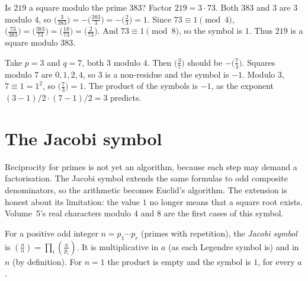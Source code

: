 \begin{examplex}
Is $219$ a square modulo the prime $383$? Factor $219=3\cdot 73$.
Both $383$ and $3$ are $3$ modulo $4$, so $\bigl(\frac{3}{383}\bigr)=-\bigl(\frac{383}{3}\bigr)=-\bigl(\frac{2}{3}\bigr)=1$.
Since $73\equiv 1\pmod 4$, $\bigl(\frac{73}{383}\bigr)=\bigl(\frac{383}{73}\bigr)=\bigl(\frac{18}{73}\bigr)=\bigl(\frac{2}{73}\bigr)$.
And $73\equiv 1\pmod 8$, so the symbol is $1$. Thus $219$ is a square modulo $383$.
\end{examplex}

\begin{examplex}
Take $p=3$ and $q=7$, both $3$ modulo $4$. Then $\bigl(\frac{3}{7}\bigr)$ should be $-\bigl(\frac{7}{3}\bigr)$.
Squares modulo $7$ are $0,1,2,4$, so $3$ is a non-residue and the symbol is $-1$.
Modulo $3$, $7\equiv 1=1^2$, so $\bigl(\frac{7}{3}\bigr)=1$. The product of the symbols is $-1$, as the exponent $(3-1)/2\cdot(7-1)/2=3$ predicts.
\end{examplex}

\section{The Jacobi symbol}

Reciprocity for primes is not yet an algorithm, because each step may demand a factorisation. The Jacobi symbol extends the same formulas to odd composite denominators, so the arithmetic becomes Euclid's algorithm. The extension is honest about its limitation: the value $1$ no longer means that a square root exists. Volume~5's real characters modulo $4$ and $8$ are the first cases of this symbol.

For a positive odd integer $n=p_1\cdots p_r$ (primes with repetition), the \emph{Jacobi symbol} is $\left(\frac an\right)=\prod_i\left(\frac a{p_i}\right)$. It is multiplicative in $a$ (as each Legendre symbol is) and in $n$ (by definition). For $n=1$ the product is empty and the symbol is $1$, for every $a$.

